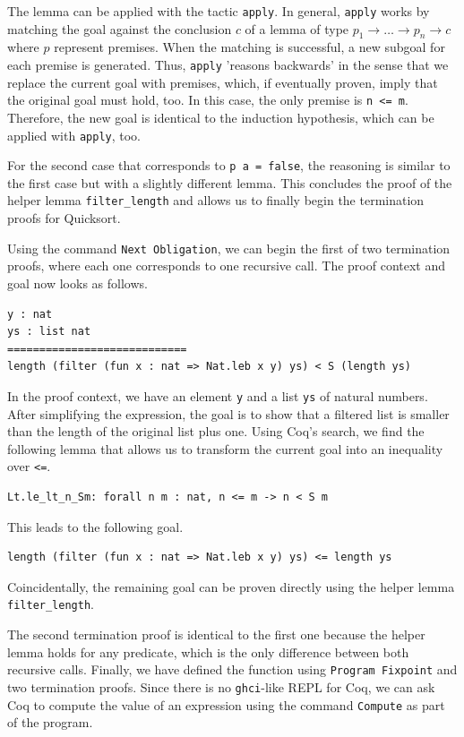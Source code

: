 \documentclass[a4paper, 11pt, fleqn, twoside]{scrreprt}
\newcommand{\hinl}[1]{\texttt{#1}}
\newcommand{\cinl}[1]{\texttt{#1}}
\begin{document}
The lemma can be applied with the tactic \cinl{apply}.
In general, \cinl{apply} works by matching the goal against the conclusion $c$ of a lemma of type $p_1 \rightarrow \dots \rightarrow p_n \rightarrow c$ where $p$ represent premises.
When the matching is successful, a new subgoal for each premise is generated.
Thus, \cinl{apply} 'reasons backwards' in the sense that we replace the current goal with premises, which, if eventually proven, imply that the original goal must hold, too. 
In this case, the only premise is \cinl{n <= m}.
Therefore, the new goal is identical to the induction hypothesis, which can be applied with \cinl{apply}, too.

For the second case that corresponds to \cinl{p a = false}, the reasoning is similar to the first case but with a slightly different lemma.
This concludes the proof of the helper lemma \cinl{filter_length} and allows us to finally begin the termination proofs for Quicksort.

Using the command \cinl{Next Obligation}, we can begin the first of two termination proofs, where each one corresponds to one recursive call.
The proof context and goal now looks as follows.

\begin{verbatim}
y : nat
ys : list nat
============================
length (filter (fun x : nat => Nat.leb x y) ys) < S (length ys)
\end{verbatim}

In the proof context, we have an element \cinl{y} and a list \cinl{ys} of natural numbers.
After simplifying the expression, the goal is to show that a filtered list is smaller than the length of the original list plus one.
Using Coq's search, we find the following lemma that allows us to transform the current goal into an inequality over \cinl{<=}.

\begin{verbatim}
Lt.le_lt_n_Sm: forall n m : nat, n <= m -> n < S m
\end{verbatim}

This leads to the following goal.

\begin{verbatim}
length (filter (fun x : nat => Nat.leb x y) ys) <= length ys
\end{verbatim}

Coincidentally, the remaining goal can be proven directly using the helper lemma \cinl{filter_length}.

The second termination proof is identical to the first one because the helper lemma holds for any predicate, which is the only difference between both recursive calls.
Finally, we have defined the function using \cinl{Program Fixpoint} and two termination proofs.
Since there is no \hinl{ghci}-like REPL for Coq, we can ask Coq to compute the value of an expression using the command \cinl{Compute} as part of the program.
\end{document}

